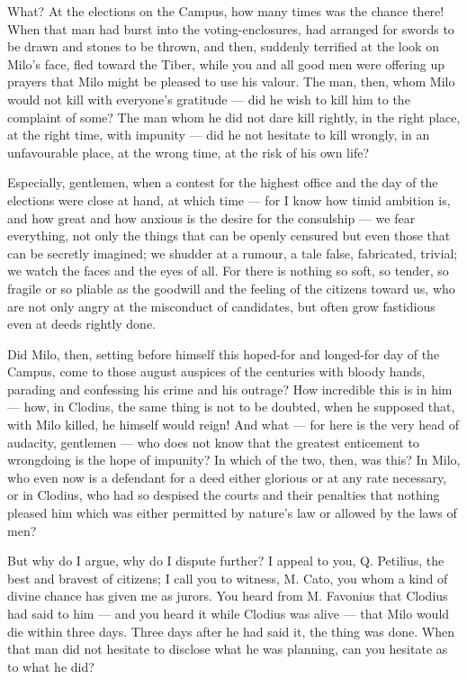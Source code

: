  What? At the elections on the Campus, how many times was the chance there! When that man had burst into the voting-enclosures, had arranged for swords to be drawn and stones to be thrown, and then, suddenly terrified at the look on Milo's face, fled toward the Tiber, while you and all good men were offering up prayers that Milo might be pleased to use his valour. The man, then, whom Milo would not kill with everyone's gratitude --- did he wish to kill him to the complaint of some? The man whom he did not dare kill rightly, in the right place, at the right time, with impunity --- did he not hesitate to kill wrongly, in an unfavourable place, at the wrong time, at the risk of his own life?

 Especially, gentlemen, when a contest for the highest office and the day of the elections were close at hand, at which time --- for I know how timid ambition is, and how great and how anxious is the desire for the consulship --- we fear everything, not only the things that can be openly censured but even those that can be secretly imagined; we shudder at a rumour, a tale false, fabricated, trivial; we watch the faces and the eyes of all. For there is nothing so soft, so tender, so fragile or so pliable as the goodwill and the feeling of the citizens toward us, who are not only angry at the misconduct of candidates, but often grow fastidious even at deeds rightly done.

 Did Milo, then, setting before himself this hoped-for and longed-for day of the Campus, come to those august auspices of the centuries with bloody hands, parading and confessing his crime and his outrage? How incredible this is in him --- how, in Clodius, the same thing is not to be doubted, when he supposed that, with Milo killed, he himself would reign! And what --- for here is the very head of audacity, gentlemen --- who does not know that the greatest enticement to wrongdoing is the hope of impunity? In which of the two, then, was this? In Milo, who even now is a defendant for a deed either glorious or at any rate necessary, or in Clodius, who had so despised the courts and their penalties that nothing pleased him which was either permitted by nature's law or allowed by the laws of men?

 But why do I argue, why do I dispute further? I appeal to you, Q. Petilius, the best and bravest of citizens; I call you to witness, M. Cato, you whom a kind of divine chance has given me as jurors. You heard from M. Favonius that Clodius had said to him --- and you heard it while Clodius was alive --- that Milo would die within three days. Three days after he had said it, the thing was done. When that man did not hesitate to disclose what he was planning, can you hesitate as to what he did?

